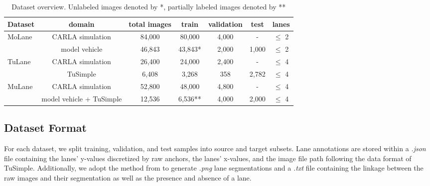 \documentclass{article}
\begin{document}
	\begin{table}
		\caption{Dataset overview. Unlabeled images denoted by *, partially labeled images denoted by ** }
		\label{table:Dataset overview}
		\small
		\centering
		\begin{tabular}{lcccccc}
			\toprule
			Dataset                  & domain             & total images & train   & validation  & test  & lanes       \\ \midrule
			\multirow{2}{*}{MoLane}  & CARLA simulation   & 84,000       & 80,000  & 4,000       & -     & \(\leq\) 2  \\ 
			& model vehicle      & 46,843       & 43,843* & 2,000       & 1,000 & \(\leq\) 2  \\ \midrule
			\multirow{2}{*}{TuLane}  & CARLA simulation   & 26,400       & 24,000  & 2,400       & -     & \(\leq\) 4  \\ 
			& TuSimple \cite{TuSimple2017} & 6,408        & 3,268   & 358         & 2,782 & \(\leq\) 4  \\ \midrule
			\multirow{2}{*}{MuLane}  & CARLA simulation   & 52,800       & 48,000  & 4,800       & -     & \(\leq\) 4  \\ 
			& model vehicle + TuSimple \cite{TuSimple2017} & 12,536      & 6,536** & 4,000       & 2,000 & \(\leq\) 4  \\ 
			\bottomrule
		\end{tabular}
	\end{table}
	
	\subsection{Dataset Format}
	For each dataset, we split training, validation, and test samples into source and target subsets. Lane annotations are stored within a \emph{.json} file containing the lanes' y-values discretized by raw anchors, the lanes' x-values, and the image file path following the data format of TuSimple\cite{TuSimple2017}. Additionally, we adopt the method from \cite{qin2020ultra} to generate \emph{.png} lane segmentations and a \emph{.txt} file containing the linkage between the raw images and their segmentation as well as the presence and absence of a lane.  
	
	
\end{document}
